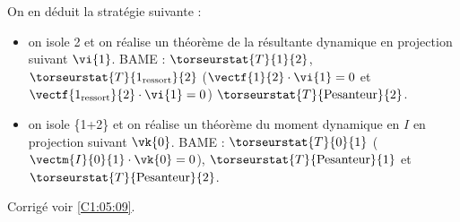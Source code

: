 On en déduit la stratégie suivante : 
\begin{itemize}
\item on isole 2 et on réalise un théorème de la résultante dynamique en projection suivant $\vi{1}$. BAME : 
$\torseurstat{T}{1}{2}$, $\torseurstat{T}{1_{\text{ressort}}}{2}$ ($\vectf{1}{2}\cdot \vi{1}= 0$ et 
$\vectf{1_{\text{ressort}}}{2}\cdot \vi{1}= 0$)
$\torseurstat{T}{\text{Pesanteur}}{2}$.
\item on isole \{1+2\} et on réalise un théorème du moment dynamique en $I$ en projection suivant $\vk{0}$. BAME : 
$\torseurstat{T}{0}{1}$ ($\vectm{I}{0}{1}\cdot \vk{0}= 0$), 
$\torseurstat{T}{\text{Pesanteur}}{1}$ et $\torseurstat{T}{\text{Pesanteur}}{2}$.

\end{itemize}
\else
\fi

\ifcolle
{}
\else
\fi

\ifprof
\else
\begin{flushright}
\footnotesize{Corrigé  voir \ref{C1:05:09}.}
\end{flushright}%
\fi